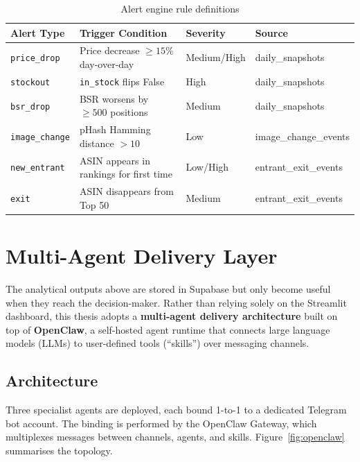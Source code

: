 \begin{table}[H]
  \centering
  \begin{tabular}{llll}
    \toprule
    \textbf{Alert Type} & \textbf{Trigger Condition} & \textbf{Severity} & \textbf{Source} \\
    \midrule
    \texttt{price\_drop}   & Price decrease $\geq 15\%$ day-over-day  & Medium/High & daily\_snapshots \\
    \texttt{stockout}      & \texttt{in\_stock} flips False              & High        & daily\_snapshots \\
    \texttt{bsr\_drop}     & BSR worsens by $\geq 500$ positions        & Medium      & daily\_snapshots \\
    \texttt{image\_change} & pHash Hamming distance $> 10$              & Low         & image\_change\_events \\
    \texttt{new\_entrant}  & ASIN appears in rankings for first time    & Low/High    & entrant\_exit\_events \\
    \texttt{exit}          & ASIN disappears from Top 50                & Medium      & entrant\_exit\_events \\
    \bottomrule
  \end{tabular}
  \caption{Alert engine rule definitions}
  \label{tab:alerts}
\end{table}

\section{Multi-Agent Delivery Layer}

The analytical outputs above are stored in Supabase but only become useful when
they reach the decision-maker. Rather than relying solely on the Streamlit
dashboard, this thesis adopts a \textbf{multi-agent delivery architecture}
built on top of \textbf{OpenClaw}, a self-hosted agent runtime that connects
large language models (LLMs) to user-defined tools (``skills'') over messaging
channels.

\subsection{Architecture}

Three specialist agents are deployed, each bound 1-to-1 to a dedicated
Telegram bot account. The binding is performed by the OpenClaw Gateway, which
multiplexes messages between channels, agents, and skills. Figure~\ref{fig:openclaw}
summarises the topology.

